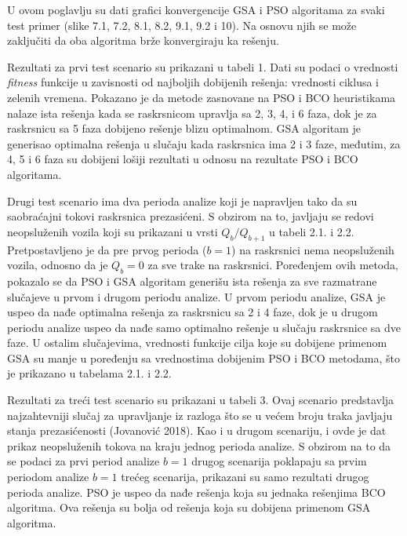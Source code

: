 U ovom poglavlju su dati grafici konvergencije GSA i PSO algoritama za svaki test primer (slike 7.1, 7.2, 8.1, 8.2, 9.1, 9.2 i 10). Na osnovu njih se može zaključiti da oba algoritma brže konvergiraju ka rešenju.

Rezultati za prvi test scenario su prikazani u tabeli 1. Dati su podaci o vrednosti \emph{fitness} funkcije u zavisnosti od najboljih dobijenih rešenja: vrednosti ciklusa i zelenih vremena. Pokazano je da metode zasnovane na PSO i BCO heuristikama nalaze ista rešenja kada se raskrsnicom upravlja sa 2, 3, 4, i 6 faza, dok je za raskrsnicu sa 5 faza dobijeno rešenje blizu optimalnom. GSA algoritam je generisao optimalna rešenja u slučaju kada raskrsnica ima 2 i 3 faze, međutim, za 4, 5 i 6 faza su dobijeni lošiji rezultati u odnosu na rezultate PSO i BCO algoritama. 


Drugi test scenario ima dva perioda analize koji je napravljen tako da su saobraćajni tokovi raskrsnica prezasićeni. S obzirom na to, javljaju se redovi neopsluženih vozila koji su prikazani u vrsti $Q_b / Q_{b+1}$ u tabeli 2.1. i 2.2. Pretpostavljeno je da pre prvog perioda ($b=1$) na raskrsnici nema neopsluženih vozila, odnosno da je $Q_b = 0$ za sve trake na raskrsnici. Poređenjem ovih metoda, pokazalo se da PSO i GSA algoritam generišu ista rešenja za sve razmatrane slučajeve u prvom i drugom periodu analize. U prvom periodu analize, GSA je uspeo da nađe optimalna rešenja za raskrsnicu sa 2 i 4 faze, dok je u drugom periodu analize uspeo da nađe samo optimalno rešenje u slučaju raskrsnice sa dve faze. U ostalim slučajevima, vrednosti funkcije cilja koje su dobijene primenom GSA su manje u poređenju sa vrednostima dobijenim PSO i BCO metodama, što je prikazano u tabelama 2.1. i 2.2. 


Rezultati za treći test scenario su prikazani u tabeli 3. Ovaj scenario predstavlja najzahtevniji slučaj za upravljanje iz razloga što se u većem broju traka javljaju stanja prezasićenosti (Jovanović 2018). Kao i u drugom scenariju, i ovde je dat prikaz neopsluženih tokova na kraju jednog perioda analize. S obzirom na to da se podaci za prvi period analize $b=1$ drugog scenarija poklapaju sa prvim periodom analize $b=1$ trećeg scenarija, prikazani su samo rezultati drugog perioda analize. PSO je uspeo da nađe rešenja koja su jednaka rešenjima BCO algoritma. Ova rešenja su bolja od rešenja koja su dobijena primenom GSA algoritma. 

